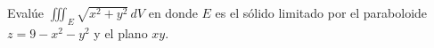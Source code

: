 \item Evalúe $\iiint_E \sqrt{x^2 + y^2} \, dV$ en donde $E$ es el sólido limitado por el paraboloide $z = 9 - x^2 - y^2$ y el plano $xy$.
